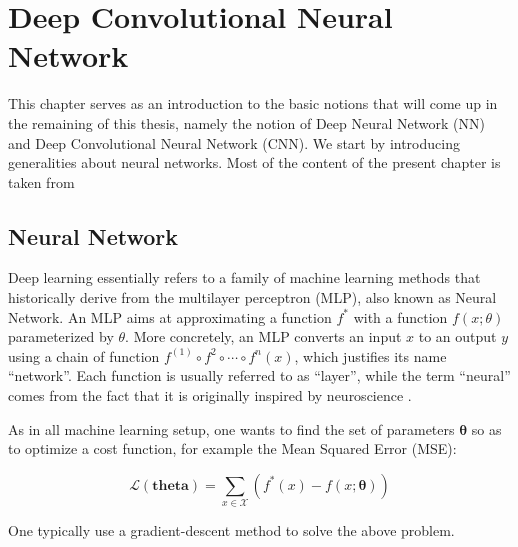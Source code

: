 \section{Deep Convolutional Neural Network}
\label{sec:cnn}

This chapter serves as an introduction to the basic notions that will come up in the remaining of this thesis, namely the notion of Deep Neural Network (NN) and Deep Convolutional Neural Network (CNN).
We start by introducing generalities about neural networks.
Most of the content of the present chapter is taken from \cite{goodfellow16}

\subsection{Neural Network}
Deep learning essentially refers to a family of machine learning methods that historically derive from the multilayer perceptron (MLP), also known as Neural Network.
An MLP aims at approximating a function $f^{*}$ with a function $f(x;\theta)$ parameterized by $\theta$.
More concretely, an MLP converts an input $x$ to an output $y$ using a chain of function $f^{(1)} \circ f^{2} \circ \cdots \circ f^{n}(x)$, which justifies its name ``network''.
Each function is usually referred to as ``layer'', while the term ``neural'' comes from the fact that it is originally inspired by neuroscience \cite{mcculloch43}.

As in all machine learning setup, one wants to find the set of parameters $\bm{\theta}$ so as to optimize a cost function, for example the Mean Squared Error (MSE):

\begin{equation}
\mathcal{L}(\bm{theta}) = \sum_{x\in \mathcal{X}}(f^{*}(x)-f(x;\bm{\theta}))
\end{equation}

One typically use a gradient-descent method to solve the above problem.

